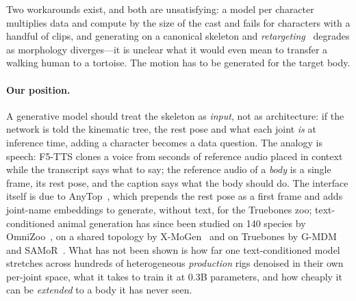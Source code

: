 Two workarounds exist, and both are unsatisfying: a model per character multiplies data and
compute by the size of the cast and fails for characters with a handful of clips, and generating
on a canonical skeleton and \emph{retargeting}~\citep{villegas2018nkn,aberman2020skeleton,lee2023same}
degrades as morphology diverges---it is unclear what it would even mean to transfer a walking human
to a tortoise. The motion has to be generated for the target body.

\paragraph{Our position.} A generative model should treat the skeleton as \emph{input}, not as
architecture: if the network is told the kinematic tree, the rest pose and what each joint \emph{is}
at inference time, adding a character becomes a data question. The analogy is speech: F5-TTS
\citep{chen2024f5tts} clones a voice from seconds of reference audio placed in context while the
transcript says what to say; the reference audio of a \emph{body} is a single frame, its rest pose,
and the caption says what the body should do. The interface itself is due to
AnyTop~\citep{gat2025anytop}, which prepends the rest pose as a first frame and
adds joint-name embeddings to generate, without text, for the Truebones zoo;
text-conditioned animal generation has since been studied on 140 species by
OmniZoo~\citep{chen2025omnizoo}, on a shared topology by X-MoGen~\citep{wang2025xmogen}
and on Truebones by G-MDM~\citep{lee2025dragon} and SAMoR~\citep{samor2026}.
What has not been shown is how far one text-conditioned model stretches across
hundreds of heterogeneous \emph{production} rigs denoised in their own
per-joint space, what it takes to train it at 0.3B parameters, and how cheaply
it can be \emph{extended} to a body it has never seen.

